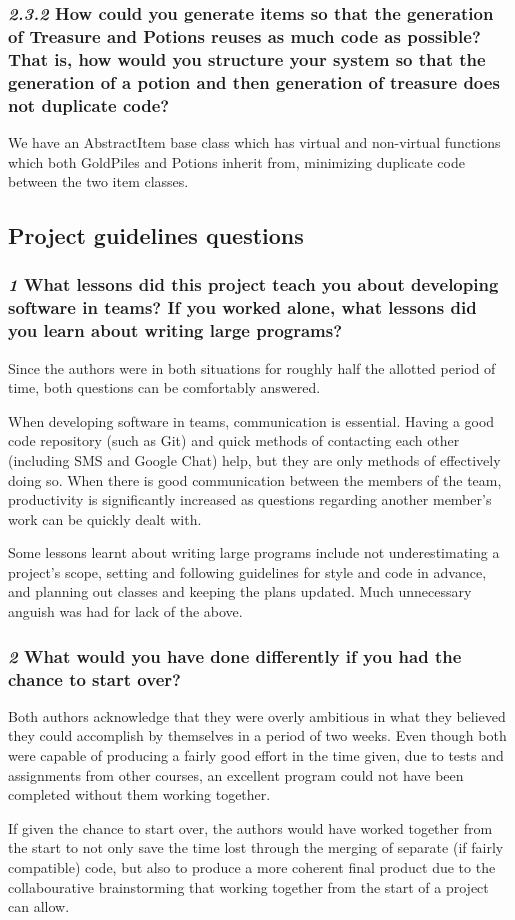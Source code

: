 \documentclass{article}
\begin{document}
\subsubsection*{\textit{2.3.2} How could you generate items so that the generation of Treasure and Potions reuses as much code as possible? That is, how would you structure your system so that the generation of a potion and then generation of treasure does not duplicate code?}

We have an AbstractItem base class which has virtual and non-virtual functions which both GoldPiles and Potions inherit from, minimizing duplicate code between the two item classes.

\subsection{Project guidelines questions}

\subsubsection*{\textit{1} What lessons did this project teach you about developing software in teams? If you worked alone, what lessons did you learn about writing large programs?}

Since the authors were in both situations for roughly half the allotted period of time, both questions can be comfortably answered.

When developing software in teams, communication is essential. Having a good code repository (such as Git) and quick methods of contacting each other (including SMS and Google Chat) help, but they are only methods of effectively doing so. When there is good communication between the members of the team, productivity is significantly increased as questions regarding another member's work can be quickly dealt with.

Some lessons learnt about writing large programs include not underestimating a project's scope, setting and following guidelines for style and code in advance, and planning out classes and keeping the plans updated. Much unnecessary anguish was had for lack of the above.

\subsubsection*{\textit{2} What would you have done differently if you had the chance to start over?}

Both authors acknowledge that they were overly ambitious in what they believed they could accomplish by themselves in a period of two weeks. Even though both were capable of producing a fairly good effort in the time given, due to tests and assignments from other courses, an excellent program could not have been completed without them working together.

If given the chance to start over, the authors would have worked together from the start to not only save the time lost through the merging of separate (if fairly compatible) code, but also to produce a more coherent final product due to the collabourative brainstorming that working together from the start of a project can allow.
\end{document}
